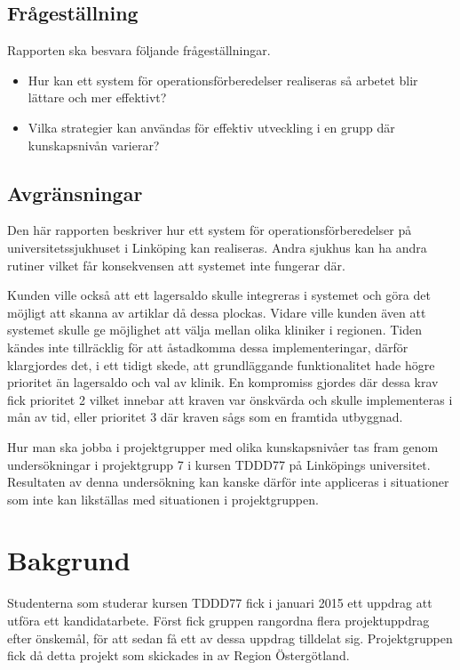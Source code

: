 \documentclass{article}
\begin{document}
\subsection{Frågeställning}
Rapporten ska besvara följande frågeställningar.
\begin{itemize}
\item Hur kan ett system för operationsförberedelser realiseras så arbetet blir lättare och mer effektivt?
\item Vilka strategier kan användas för effektiv utveckling i en grupp där kunskapsnivån varierar? 
\end{itemize}

\subsection{Avgränsningar}
Den här rapporten beskriver hur ett system för operationsförberedelser på universitetssjukhuset i Linköping kan realiseras. Andra sjukhus kan ha andra rutiner vilket får konsekvensen att systemet inte fungerar där.

Kunden ville också att ett lagersaldo skulle integreras i systemet och göra det möjligt att skanna av artiklar då dessa plockas. Vidare ville kunden även att systemet skulle ge möjlighet att välja mellan olika kliniker i regionen. Tiden kändes inte tillräcklig för att åstadkomma dessa implementeringar, därför klargjordes det, i ett tidigt skede, att grundläggande funktionalitet hade högre prioritet än lagersaldo och val av klinik. En kompromiss gjordes där dessa krav fick prioritet 2 vilket innebar att kraven var önskvärda och skulle implementeras i mån av tid, eller prioritet 3 där kraven sågs som en framtida utbyggnad.

Hur man ska jobba i projektgrupper med olika kunskapsnivåer tas fram genom undersökningar i projektgrupp 7 i kursen TDDD77 på Linköpings universitet. Resultaten av denna undersökning kan kanske därför inte appliceras i situationer som inte kan likställas med situationen i projektgruppen.

\section{Bakgrund}
\label{bakgrund}
Studenterna som studerar kursen TDDD77 fick i januari 2015 ett uppdrag att utföra ett kandidatarbete. Först fick gruppen rangordna flera projektuppdrag efter önskemål, för att sedan få ett av dessa uppdrag tilldelat sig. Projektgruppen fick då detta projekt som skickades in av Region Östergötland.
\end{document}
